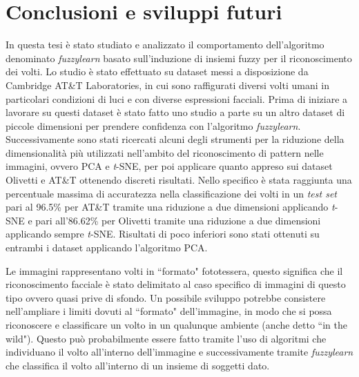\documentclass[12pt,italian]{report}
\begin{document}
\chapter*{Conclusioni e sviluppi futuri}
\label{cap:conclusioni}
In questa tesi è stato studiato e analizzato il comportamento dell'algoritmo denominato \emph{fuzzylearn} basato sull'induzione di insiemi fuzzy per il riconoscimento dei volti. Lo studio è stato effettuato su dataset messi a disposizione da Cambridge AT\&T Laboratories, in cui sono raffigurati diversi volti umani in particolari condizioni di luci e con diverse espressioni facciali. Prima di iniziare a lavorare su questi dataset è stato fatto uno studio a parte su un altro dataset di piccole dimensioni per prendere confidenza con l'algoritmo \emph{fuzzylearn}. Successivamente sono stati ricercati alcuni degli strumenti per la riduzione della dimensionalità più utilizzati nell'ambito del riconoscimento di pattern nelle immagini, ovvero PCA e \emph{t}-SNE, per poi applicare quanto appreso sui dataset Olivetti e AT\&T ottenendo discreti risultati. Nello specifico è stata raggiunta una percentuale massima di accuratezza nella classificazione dei volti in un \emph{test set} pari al 96.5\% per AT\&T tramite una riduzione a due dimensioni applicando \emph{t}-SNE e pari all'86.62\% per Olivetti tramite una riduzione a due dimensioni applicando sempre \emph{t}-SNE. Risultati di poco inferiori sono stati ottenuti su entrambi i dataset applicando l'algoritmo PCA.

Le immagini rappresentano volti in ``formato" fototessera, questo significa che il riconoscimento facciale è stato delimitato al caso specifico di immagini di questo tipo ovvero quasi prive di sfondo. Un possibile sviluppo potrebbe consistere nell'ampliare i limiti dovuti al ``formato" dell'immagine, in modo che si possa riconoscere e classificare un volto in un qualunque ambiente (anche detto ``in the wild"). Questo può probabilmente essere fatto tramite l'uso di algoritmi che individuano il volto all'interno dell'immagine e successivamente tramite \emph{fuzzylearn} che classifica il volto all'interno di un insieme di soggetti dato.
\end{document}
